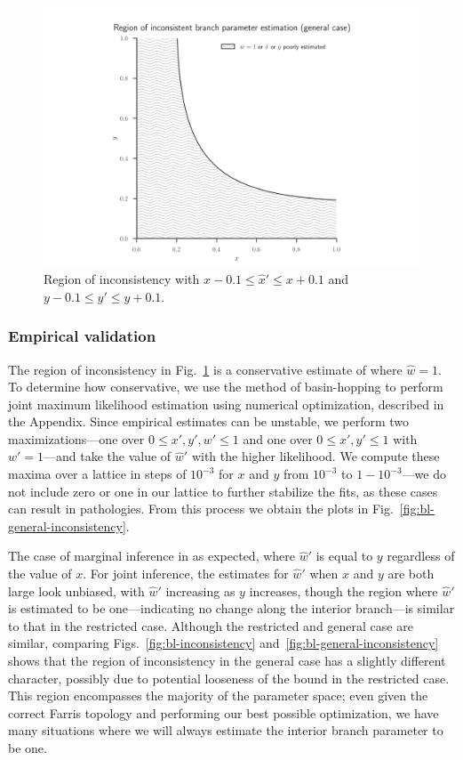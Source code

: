 \documentclass{article}
\begin{document}
\begin{figure}
\centering
\includegraphics[width=.9\textwidth]{bl-loose-inconsistency-inkscape}
\caption{Region of inconsistency with $x-0.1 \le \hat{x}' \le x+0.1$ and $y-0.1 \le \hat{y}' \le y+0.1$.}
\label{fig:bl-loose-inconsistency}
\end{figure}

\subsubsection*{Empirical validation}

The region of inconsistency in Fig.~\ref{fig:bl-loose-inconsistency} is a conservative estimate of where $\hat{w}=1$.
To determine how conservative, we use the method of basin-hopping \cite{Wales1997} to perform joint maximum likelihood estimation using numerical optimization, described in the Appendix.
Since empirical estimates can be unstable, we perform two maximizations---one over $0 \le x',y',w' \le 1$ and one over $0 \le x',y' \le 1$ with $w'=1$---and take the value of $\hat{w}'$ with the higher likelihood.
We compute these maxima over a lattice in steps of $10^{-3}$ for $x$ and $y$ from $10^{-3}$ to $1-10^{-3}$---we do not include zero or one in our lattice to further stabilize the fits, as these cases can result in pathologies.
From this process we obtain the plots in Fig.~\ref{fig:bl-general-inconsistency}.

The case of marginal inference in as expected, where $\hat{w}'$ is equal to $y$ regardless of the value of $x$.
For joint inference, the estimates for $\hat{w}'$ when $x$ and $y$ are both large look unbiased, with $\hat{w}'$ increasing as $y$ increases, though the region where $\hat{w}'$ is estimated to be one---indicating no change along the interior branch---is similar to that in the restricted case.
Although the restricted and general case are similar, comparing Figs.~\ref{fig:bl-inconsistency} and~\ref{fig:bl-general-inconsistency} shows that the region of inconsistency in the general case has a slightly different character, possibly due to potential looseness of the bound in the restricted case.
This region encompasses the majority of the parameter space; even given the correct Farris topology and performing our best possible optimization, we have many situations where we will always estimate the interior branch parameter to be one.
\end{document}
